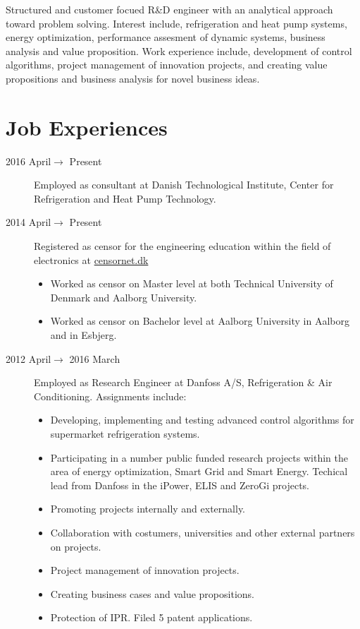 \documentclass[margin,line,a4paper]{resume}
\begin{document}
\begin{resume}
Structured and customer focued R\&D engineer with an analytical approach toward problem solving. Interest include, refrigeration and heat pump systems, energy optimization, performance assesment of dynamic systems, business analysis and value proposition. Work experience include, development of control algorithms, project management of innovation projects, and creating value propositions and business analysis for novel business ideas.

    
\section{\mysidestyle Job Experiences}\vspace{1mm}
\begin{description}
\item[2016 April$\rightarrow$ Present] Employed as consultant at Danish Technological Institute, Center for Refrigeration and Heat Pump Technology.

   \item[2014 April$\rightarrow$ Present] Registered as censor for the engineering education within the field of electronics at \href{https://www.censornet.dk/welcome.htm}{censornet.dk}
     \begin{itemize}
     \item Worked as censor on Master level at both Technical University of Denmark and Aalborg University.
     \item Worked as censor on Bachelor level at Aalborg University in Aalborg and in Esbjerg.
     \end{itemize}
    
    \item[2012 April$\rightarrow$ 2016 March] Employed as Research Engineer at Danfoss A/S, Refrigeration \& Air Conditioning. Assignments include:
      \begin{itemize}
      \item Developing, implementing and testing advanced control algorithms for supermarket refrigeration systems.
      \item Participating in a number public funded research projects within the area of energy optimization, Smart Grid and Smart Energy. Techical lead from Danfoss in the iPower, ELIS and ZeroGi projects.
      \item Promoting projects internally and externally.
      \item Collaboration with costumers, universities and other external partners on projects. 
      \item Project management of innovation projects.
      \item Creating business cases and value propositions.
      \item Protection of IPR. Filed 5 patent applications.
      \end{itemize}


\end{description}
\end{resume}
\end{document}
